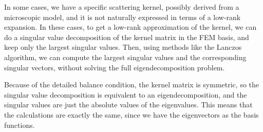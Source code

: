 \documentclass[12pt]{article}
\begin{document}
In some cases, we have a specific scattering kernel, possibly derived from a microscopic model, and
it is not naturally expressed in terms of a low-rank expansion. In these cases, to get a low-rank
approximation of the kernel, we can do a singular value decomposition of the kernel matrix in the
FEM basis, and keep only the largest singular values. Then, using methods like the Lanczos
algorithm, we can compute the largest singular values and the corresponding singular vectors,
without solving the full eigendecomposition problem.

Because of the detailed balance condition, the kernel matrix is symmetric, so the singular value
decomposition is equivalent to an eigendecomposition, and the singular values are just the absolute
values of the eigenvalues. This means that the calculations are exactly the same, since we have the
eigenvectors as the basis functions.
\end{document}
